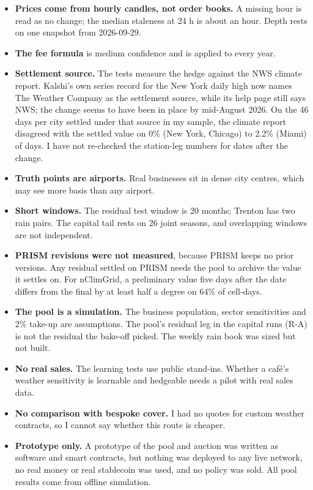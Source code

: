 \documentclass[11pt]{article}
\begin{document}
\begin{itemize}
\item \textbf{Prices come from hourly candles, not order books.} A missing hour is read as no change; the median staleness at 24 h is about an hour. Depth rests on one snapshot from 2026-09-29.
\item \textbf{The fee formula} is medium confidence and is applied to every year.
\item \textbf{Settlement source.} The tests measure the hedge against the NWS climate report. Kalshi's own series record for the New York daily high now names The Weather Company as the settlement source, while its help page still says NWS; the change seems to have been in place by mid-August 2026. On the 46 days per city settled under that source in my sample, the climate report disagreed with the settled value on 0\% (New York, Chicago) to 2.2\% (Miami) of days. I have not re-checked the station-leg numbers for dates after the change.
\item \textbf{Truth points are airports.} Real businesses sit in dense city centres, which may see more basis than any airport.
\item \textbf{Short windows.} The residual test window is 20 months; Trenton has two rain pairs. The capital tail rests on 26 joint seasons, and overlapping windows are not independent.
\item \textbf{PRISM revisions were not measured}, because PRISM keeps no prior versions. Any residual settled on PRISM needs the pool to archive the value it settles on. For nClimGrid, a preliminary value five days after the date differs from the final by at least half a degree on 64\% of cell-days.
\item \textbf{The pool is a simulation.} The business population, sector sensitivities and 2\% take-up are assumptions. The pool's residual leg in the capital runs (R-A) is not the residual the bake-off picked. The weekly rain book was sized but not built.
\item \textbf{No real sales.} The learning tests use public stand-ins. Whether a café's weather sensitivity is learnable and hedgeable needs a pilot with real sales data.
\item \textbf{No comparison with bespoke cover.} I had no quotes for custom weather contracts, so I cannot say whether this route is cheaper.
\item \textbf{Prototype only.} A prototype of the pool and auction was written as software and smart contracts, but nothing was deployed to any live network, no real money or real stablecoin was used, and no policy was sold. All pool results come from offline simulation.
\end{itemize}
\end{document}
